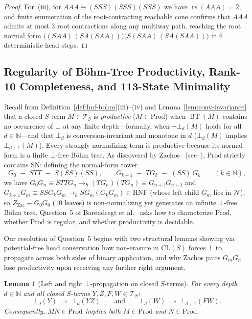 \documentclass[11pt,reqno]{amsart}
\numberwithin{equation}{section}
\theoremstyle{plain}
\newtheorem{lemma}[theorem]{Lemma}
\theoremstyle{definition}
\theoremstyle{remark}
\DeclareMathOperator{\rs}{rs}
\DeclareMathOperator{\BT}{BT}
\newcommand{\CLS}{\mathrm{CL}(S)}
\newcommand{\TS}{\mathcal{T}_S}
\newcommand{\HNF}{\mathrm{HNF}}
\newcommand{\SN}{\mathrm{SN}}
\newcommand{\Prod}{\mathrm{Prod}}
\begin{document}
\begin{proof}
For~(iii), for $A A A \equiv (S S S)(S S S)(S S S)$ we have $\rs(A A A) = 2$, and finite enumeration of the root-contracting reachable cone confirms that $A A A$ admits at most $3$ root contractions along any multiway path, reaching the root normal form $\bigl((S A A)\,(S A (S A A))\bigr)\bigl(S(S A A)\,(S A (S A A))\bigr)$ in $6$ deterministic head steps.
\end{proof}

\subsection{Regularity of B\"ohm-Tree Productivity, Rank-10 Completeness, and 113-State Minimality}\label{subsec:q5-productivity}

Recall from Definition~\ref{def:hnf-bohm}(iii)--(iv) and Lemma~\ref{lem:conv-invariance} that a closed $S$-term $M \in \TS$ is \emph{productive} ($M \in \Prod$) when $\BT(M)$ contains no occurrence of $\bot$ at any finite depth---formally, when $\neg\bot_d(M)$ holds for all $d \in \mathbb{N}$---and that $\bot_d$ is conversion-invariant and monotone in $d$ ($\bot_d(M)$ implies $\bot_{d+1}(M)$). Every strongly normalizing term is productive because its normal form is a finite $\bot$-free B\"ohm tree. As discovered by Zachos~\cite{Zachos1978} (see~\cite[p.~80]{BarendregtEndrullisKlopWaldmann2017}), $\Prod$ strictly contains $\SN$: defining the normal-form tower
\begin{equation}\label{eq:zachos-tower}
G_0 \;\equiv\; S T T \;\equiv\; S(S S)(S S),
\qquad
G_{k+1} \;\equiv\; T G_k \;\equiv\; (S S)\,G_k
\qquad (k \in \mathbb{N}),
\end{equation}
we have $G_0 G_n \equiv S T T G_n \to_h (T G_n)(T G_n) \equiv G_{n+1} G_{n+1}$ and $G_{k+1} G_m \equiv S S G_k G_m \to_h S G_m (G_k G_m) \in \HNF$ (whose left child $G_m$ lies in $\mathcal{N}$), so $Z_{\mathrm{Zac}} \equiv G_0 G_0$ ($10$ leaves) is non-normalizing yet generates an infinite $\bot$-free B\"ohm tree. Question~5 of Barendregt et al.~\cite[p.~80]{BarendregtEndrullisKlopWaldmann2017} asks how to characterize $\Prod$, whether $\Prod$ is regular, and whether productivity is decidable.

Our resolution of Question~5 begins with two structural lemmas showing via potential-free head conservation how non-erasure in $\CLS$ forces $\bot$ to propagate across both sides of binary application, and why Zachos pairs $G_m G_n$ lose productivity upon receiving any further right argument.

\begin{lemma}[Left and right $\bot$-propagation on closed $S$-terms]\label{lem:bot-propagation}
For every depth $d \in \mathbb{N}$ and all closed $S$-terms $Y, Z, F, W \in \TS$:
\begin{equation}\label{eq:both-sink-laws}
\bot_d(Y) \;\Longrightarrow\; \bot_d(Y Z)
\qquad\textrm{and}\qquad
\bot_d(W) \;\Longrightarrow\; \bot_{d+1}(F W).
\end{equation}
Consequently, $M N \in \Prod$ implies both $M \in \Prod$ and $N \in \Prod$.
\end{lemma}
\end{document}
